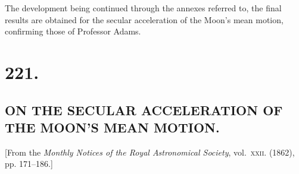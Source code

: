 \documentclass[11pt,a4paper]{book}
\begin{document}
The development being continued through the annexes referred to, the final results are obtained for the secular acceleration of the Moon's mean motion, confirming those of Professor Adams.
\clearpage



\section*{\large 221.}
\subsection*{ON THE SECULAR ACCELERATION OF THE MOON'S MEAN MOTION.}

\begin{center}
[From the \textit{Monthly Notices of the Royal Astronomical Society}, vol.~\textsc{xxii}. (1862), pp. 171--186.]
\end{center}

\medskip
\end{document}
